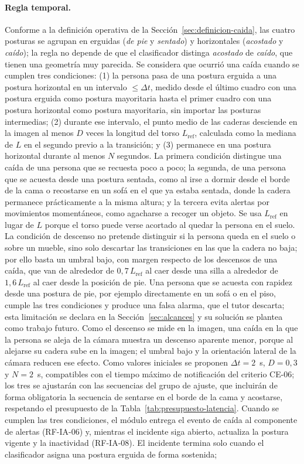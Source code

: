 \documentclass[12pt,a4paper,oneside]{book}
\theoremstyle{plain}
\theoremstyle{definition}
\theoremstyle{remark}
\begin{document}
\paragraph{Regla temporal.} Conforme a la definición operativa de la Sección~\ref{sec:definicion-caida}, las cuatro posturas se agrupan en erguidas (\textit{de pie} y \textit{sentado}) y horizontales (\textit{acostado} y \textit{caído}); la regla no depende de que el clasificador distinga \textit{acostado} de \textit{caído}, que tienen una geometría muy parecida. Se considera que ocurrió una caída cuando se cumplen tres condiciones: (1) la persona pasa de una postura erguida a una postura horizontal en un intervalo $\leq \Delta t$, medido desde el último cuadro con una postura erguida como postura mayoritaria hasta el primer cuadro con una postura horizontal como postura mayoritaria, sin importar las posturas intermedias; (2) durante ese intervalo, el punto medio de las caderas desciende en la imagen al menos $D$ veces la longitud del torso $L_{\text{ref}}$, calculada como la mediana de $L$ en el segundo previo a la transición; y (3) permanece en una postura horizontal durante al menos $N$ segundos. La primera condición distingue una caída de una persona que se recuesta poco a poco; la segunda, de una persona que se acuesta desde una postura sentada, como al irse a dormir desde el borde de la cama o recostarse en un sofá en el que ya estaba sentada, donde la cadera permanece prácticamente a la misma altura; y la tercera evita alertas por movimientos momentáneos, como agacharse a recoger un objeto. Se usa $L_{\text{ref}}$ en lugar de $L$ porque el torso puede verse acortado al quedar la persona en el suelo. La condición de descenso no pretende distinguir si la persona queda en el suelo o sobre un mueble, sino solo descartar las transiciones en las que la cadera no baja; por ello basta un umbral bajo, con margen respecto de los descensos de una caída, que van de alrededor de $0{,}7\,L_{\text{ref}}$ al caer desde una silla a alrededor de $1{,}6\,L_{\text{ref}}$ al caer desde la posición de pie. Una persona que se acuesta con rapidez desde una postura de pie, por ejemplo directamente en un sofá o en el piso, cumple las tres condiciones y produce una falsa alarma, que el tutor descarta; esta limitación se declara en la Sección~\ref{sec:alcances} y su solución se plantea como trabajo futuro. Como el descenso se mide en la imagen, una caída en la que la persona se aleja de la cámara muestra un descenso aparente menor, porque al alejarse su cadera sube en la imagen; el umbral bajo y la orientación lateral de la cámara reducen ese efecto. Como valores iniciales se proponen $\Delta t = 2$~s, $D = 0{,}3$ y $N = 2$~s, compatibles con el tiempo máximo de notificación del criterio CE-06; los tres se ajustarán con las secuencias del grupo de ajuste, que incluirán de forma obligatoria la secuencia de sentarse en el borde de la cama y acostarse, respetando el presupuesto de la Tabla~\ref{tab:presupuesto-latencia}. Cuando se cumplen las tres condiciones, el módulo entrega el evento de caída al componente de alertas (RF-IA-06) y, mientras el incidente siga abierto, actualiza la postura vigente y la inactividad (RF-IA-08). El incidente termina solo cuando el clasificador asigna una postura erguida de forma sostenida; 
\end{document}
